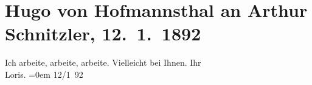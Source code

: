 

         \renewcommand{\erwaehnteOrte}{Orte: Wien}
         \renewcommand{\erwaehnteWerke}{}
               \section[Hugo von Hofmannsthal an Arthur Schnitzler, 12. 1. 1892]{ Hugo von Hofmannsthal an Arthur Schnitzler, 12. 1. 1892}\nopagebreak{}\rehead{ }\begin{ledgroupsized}[t]{13cm}\normalsize\beginnumbering \toendnotes[C]{\smallbreak\pagebreak[2]} 
\toendnotes[C]{\smallbreak}\pstart
           \noindent{}{\pb}Ich arbeite, arbeite,
               arbeite.\pend
           \pstart
           Vielleicht \label{K_L00061_1v}\label{K_L00061_1h} bei Ihnen.\pend
           \pstart
           Ihr{\\[\baselineskip]}\spacefill\mbox{Loris.}\pend
           \leftskip=0em{}\pstart
           \raggedleft{}12/1 92\pend
           
         
         \endnumbering{}\end{ledgroupsized}  \newcommand{\dateiname}{L00061}\newcommand{\titel}{Hugo von Hofmannsthal an Arthur Schnitzler, 12. 1. 1892}\newcommand{\editorInnen}{Martin Anton Müller und Gerd-Hermann Susen}
      